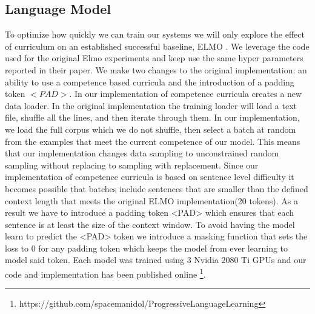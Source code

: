 \subsection{Language Model}
To optimize how quickly we can train our systems we will only explore the effect of curriculum on an established successful baseline, ELMO \cite{Smith2019ContextualWR}. We leverage the code used for the original Elmo experiments and keep use the same hyper parameters reported in their paper. We make two changes to the original implementation: an ability to use a competence based curricula and the introduction of a padding token $<PAD>$. In our implementation of competence curricula creates a new data loader. In the original implementation the training loader will load a text file, shuffle all the lines, and then iterate through them. In our implementation, we load the full corpus which we do not shuffle, then select a batch at random from the examples that meet the current competence of our model. This means that our implementation changes data sampling to unconstrained random sampling without replacing to sampling with replacement. Since our implementation of competence curricula is based on sentence level difficulty it becomes possible that batches include sentences that are smaller than the defined context length that meets the original ELMO implementation(20 tokens). As a result we have to introduce a padding token <PAD> which ensures that each sentence is at least the size of the context window. To avoid having the model learn to predict the <PAD> token we introduce a masking function that sets the loss to 0 for any padding token which keeps the model from ever learning to model said token. Each model was trained using 3 Nvidia 2080 Ti GPUs and our code and implementation has been published online \footnote{https://github.com/spacemanidol/ProgressiveLanguageLearning}. 
